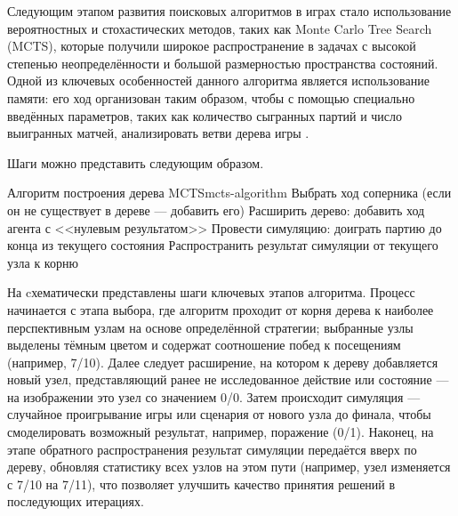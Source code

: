 Следующим этапом развития поисковых алгоритмов в играх стало использование вероятностных и стохастических методов, таких как Monte Carlo Tree Search (MCTS), которые получили широкое распространение в задачах с высокой степенью неопределённости и большой размерностью пространства состояний. Одной из ключевых особенностей данного алгоритма является использование памяти: его ход организован таким образом, чтобы с помощью специально введённых параметров, таких как количество сыгранных партий и число выигранных матчей, анализировать ветви дерева игры \cite{monte-carlo-tree}.

Шаги  можно представить следующим образом.

\begin{alg}{Алгоритм построения дерева MCTS}{mcts-algorithm}
        \State Выбрать ход соперника (если он не существует в дереве --- добавить его)
        \State Расширить дерево: добавить ход агента с <<нулевым результатом>>
        \State Провести симуляцию: доиграть партию до конца из текущего состояния
        \State Распространить результат симуляции от текущего узла к корню
    \EndWhile
\end{alg}

На  cхематически представлены шаги ключевых этапов алгоритма. Процесс начинается с этапа выбора, где алгоритм проходит от корня дерева к наиболее перспективным узлам на основе определённой стратегии; выбранные узлы выделены тёмным цветом и содержат соотношение побед к посещениям (например, 7/10). Далее следует расширение, на котором к дереву добавляется новый узел, представляющий ранее не исследованное действие или состояние --- на изображении это узел со значением 0/0. Затем происходит симуляция --- случайное проигрывание игры или сценария от нового узла до финала, чтобы смоделировать возможный результат, например, поражение (0/1). Наконец, на этапе обратного распространения результат симуляции передаётся вверх по дереву, обновляя статистику всех узлов на этом пути (например, узел изменяется с 7/10 на 7/11), что позволяет улучшить качество принятия решений в последующих итерациях.


